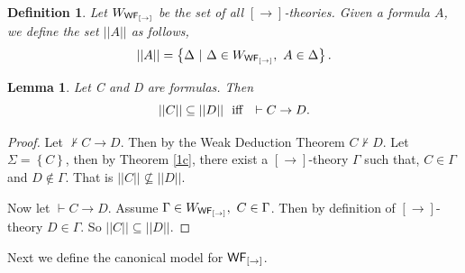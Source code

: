 \documentclass[12pt]{article}
\newtheorem{lem}[thm]{Lemma}
\newtheorem{dfn}[thm]{Definition}
\begin{document}


\begin{dfn}
Let  $ W_{{\sf WF_{[\rightarrow]}}}$ be the set of all  $ [\rightarrow] $-theories. Given a formula $ A $, we define the set $|| A ||$ as follows,
$$ ||A|| = \left\lbrace  \Delta~|~\Delta \in W_{{\sf WF_{[\rightarrow]}}}, ~ A \in \Delta\right\rbrace  .$$
\end{dfn}

\begin{lem}
\label{1kk}
Let C and D are formulas. Then
$$ || C|| \subseteq  || D|| ~~{\rm iff}~~\vdash C\rightarrow D .$$


\end{lem}
\begin{proof}  Let $ \nvdash C\rightarrow D $. Then by the Weak Deduction Theorem $ C\nvdash D $. Let $ \Sigma= \left\lbrace C\right\rbrace  $, then by Theorem \ref{1c},  there exist a  $[ \rightarrow ]$-theory $ \Gamma $ such that, $ C \in \Gamma $ and $ D \notin \Gamma $. That is $  || C|| \nsubseteq  || D||  $.

Now let $ \vdash C\rightarrow D $. Assume $ \Gamma \in W_{{\sf WF_{[\rightarrow]}}}, ~C\in \Gamma $. Then by definition of $ [\rightarrow] $-theory $ D \in \Gamma $. So $  || C || \subseteq  || D||$.
\end{proof}

Next we define the canonical model for ${\sf WF_{[\rightarrow]}}$.
\end{document}
